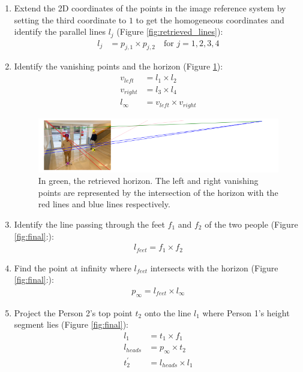 \begin{enumerate}
    
    \item Extend the 2D coordinates of the points in the image reference system by setting the third coordinate to $1$ to get the homogeneous coordinates and identify the parallel lines $l_j$ (Figure \ref{fig:retrieved_lines}):
    \begin{align*}
        l_{j} &= p_{j,1} \times p_{j,2} \quad \text{for }j=1,2,3,4
    \end{align*}

    \item Identify the vanishing points and the horizon (Figure \ref{fig:wide}):
    \begin{align*}
        v_{left} &= l_{1} \times l_{2}\\
        v_{right} &= l_{3} \times l_{4}\\
        l_{\infty} &= v_{left} \times v_{right}
    \end{align*}

\begin{figure}
    \centering
    \includegraphics[width=0.75\linewidth]{img/wide.png}
    \caption{In green, the retrieved horizon. The left and right vanishing points are represented by the intersection of the horizon with the red lines and blue lines respectively.}
    \label{fig:wide}
\end{figure}

    \item Identify the line passing through the feet $f_1$ and $f_2$ of the two people (Figure \ref{fig:final}:):
    \begin{align*}
        l_{feet} = f_{1} \times f_{2}
    \end{align*}
    
    \item Find the point at infinity where $l_{feet}$ intersects with the horizon (Figure \ref{fig:final}:):
    \begin{align*}
        p_{\infty} = l_{feet} \times l_{\infty}
    \end{align*}

    \item Project the Person 2's top point $t_2$ onto the line $l_1$ where Person 1's height segment lies (Figure \ref{fig:final}):
    \begin{align*}
        l_{1} &= t_1 \times f_1 \\
        l_{heads} &= p_{\infty} \times t_2 \\
        t_2^{\prime} &= l_{heads} \times l_{1}
    \end{align*}


\end{enumerate}
